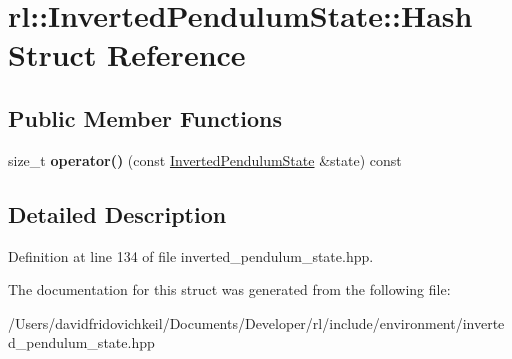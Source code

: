 \hypertarget{structrl_1_1_inverted_pendulum_state_1_1_hash}{}\section{rl\+:\+:Inverted\+Pendulum\+State\+:\+:Hash Struct Reference}
\label{structrl_1_1_inverted_pendulum_state_1_1_hash}
\subsection*{Public Member Functions}
\begin{DoxyCompactItemize}
\item 
\hypertarget{structrl_1_1_inverted_pendulum_state_1_1_hash_a434908dd0edd9f5445fdd5f397be1149}{}\label{structrl_1_1_inverted_pendulum_state_1_1_hash_a434908dd0edd9f5445fdd5f397be1149} 
size\+\_\+t {\bfseries operator()} (const \hyperlink{structrl_1_1_inverted_pendulum_state}{Inverted\+Pendulum\+State} \&state) const
\end{DoxyCompactItemize}


\subsection{Detailed Description}


Definition at line 134 of file inverted\+\_\+pendulum\+\_\+state.\+hpp.



The documentation for this struct was generated from the following file\+:\begin{DoxyCompactItemize}
\item 
/\+Users/davidfridovichkeil/\+Documents/\+Developer/rl/include/environment/inverted\+\_\+pendulum\+\_\+state.\+hpp\end{DoxyCompactItemize}
